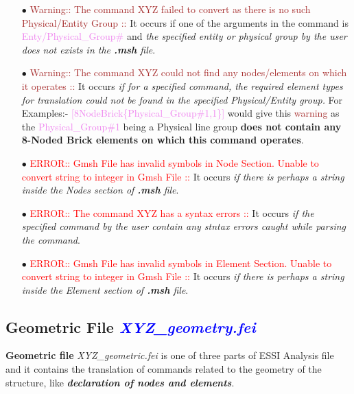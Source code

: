\documentclass[11pt]{article}
\begin{document}
\begin{itemize}
  \item[$\bullet$]  \textcolor{brown}{Warning::  The  command  XYZ failed to
  convert  as there is no such Physical/Entity Group ::} 
  It occurs if one of
  the arguments in the command is \textcolor{violet}{Enty/Physical\_Group\#}
  and  \textit{the  specified  entity or physical group by the user does not
  exists in the \textbf{.msh} file}.
  
  \item[$\bullet$]  \textcolor{brown}{Warning::  The  command  XYZ could not
  find any nodes/elements on which it operates :: } 
  It occurs \textit{if for
  a  specified command, the required element types for translation could not
  be   found   in  the  specified  Physical/Entity  group.}  For  Examples:-
  \textcolor{violet}{[8NodeBrick\{Physical\_Group\#1,1\}]}  would  give this
  \textcolor{brown}{warning}  as  the \textcolor{violet}{Physical\_Group\#1}
  being  a  Physical  line  group \textbf{does not contain any 8-Noded Brick
  elements on which this command operates}.
  
  \item[$\bullet$]  \textcolor{red}{ERROR:: Gmsh File has invalid symbols in
  Node  Section.  Unable  to  convert string to integer in Gmsh File :: } 
  It
  occurs  \textit{if  there  is perhaps a string inside the Nodes section of
  \textbf{.msh} file}.
  
  \item[$\bullet$]  \textcolor{red}{ERROR::  The  command  XYZ  has a syntax
  errors :: } 
  It occurs \textit{if the specified command by the user contain
  any stntax errors caught while parsing the command}.
  
  \item[$\bullet$]  \textcolor{red}{ERROR:: Gmsh File has invalid symbols in
  Element  Section. Unable to convert string to integer in Gmsh File :: } 
  It occurs  \textit{if there is perhaps a string inside the Element section of
  \textbf{.msh} file}.

\end{itemize}

\subsection{Geometric File \textcolor{blue}{\textit{XYZ\_geometry.fei}}}

\textbf{Geometric file} \textit{XYZ\_geometric.fei} is one of three parts of
ESSI Analysis file and it contains the translation of commands related to the
geometry of the structure, like \textbf{\textit{declaration of nodes and elements}}.
\end{document}
